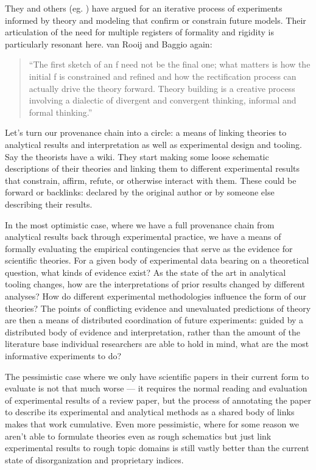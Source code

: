 \documentclass[10pt]{article}
\begin{document}
\begin{multicols}{2}
They and others (eg. \cite{guestHowComputationalModeling2021} )
have argued for an iterative process of experiments informed by theory
and modeling that confirm or constrain future models. Their articulation
of the need for multiple registers of formality and rigidity is
particularly resonant here. van Rooij and Baggio again:

\begin{quote}
``The first sketch of an f need not be the final one; what matters is
how the initial f is constrained and refined and how the rectification
process can actually drive the theory forward. Theory building is a
creative process involving a dialectic of divergent and convergent
thinking, informal and formal thinking.'' \cite{vanrooijTheoryTestHow2021} 
\end{quote}

Let's turn our provenance chain into a circle: a means of linking
theories to analytical results and interpretation as well as
experimental design and tooling. Say the theorists have a wiki. They
start making some loose schematic descriptions of their theories and
linking them to different experimental results that constrain, affirm,
refute, or otherwise interact with them. These could be forward or
backlinks: declared by the original author or by someone else describing
their results.

In the most optimistic case, where we have a full provenance chain from
analytical results back through experimental practice, we have a means
of formally evaluating the empirical contingencies that serve as the
evidence for scientific theories. For a given body of experimental data
bearing on a theoretical question, what kinds of evidence exist? As the
state of the art in analytical tooling changes, how are the
interpretations of prior results changed by different analyses? How do
different experimental methodologies influence the form of our theories?
The points of conflicting evidence and unevaluated predictions of theory
are then a means of distributed coordination of future experiments:
guided by a distributed body of evidence and interpretation, rather than
the amount of the literature base individual researchers are able to
hold in mind, what are the most informative experiments to do?

The pessimistic case where we only have scientific papers in their
current form to evaluate is not that much worse --- it requires the
normal reading and evaluation of experimental results of a review paper,
but the process of annotating the paper to describe its experimental and
analytical methods as a shared body of links makes that work cumulative.
Even more pessimistic, where for some reason we aren't able to formulate
theories even as rough schematics but just link experimental results to
rough topic domains is still vastly better than the current state of
disorganization and proprietary indices.


\end{multicols}
\end{document}
